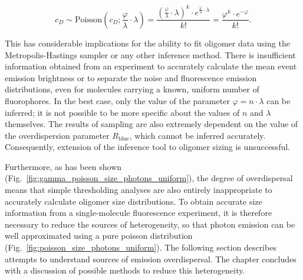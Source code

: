 \begin{equation}
c_D \sim \text{Poisson}(c_D; \frac{\varphi}{\lambda} \cdot \lambda) = \frac{(\frac{\varphi}{\lambda} \cdot \lambda)^k \cdot e^{\frac{\varphi}{\lambda} \cdot \lambda}}{k!} = \frac{\varphi^{k} \cdot e^{-\varphi}}{k!}.
\label{eq:n_photons_2}
\end{equation}  

This has considerable implications for the ability to fit oligomer data using the Metropolis-Hastings sampler or any other inference method. There is insufficient information obtained from an experiment to accurately calculate the mean event emission brightness or to separate the noise and fluorescence emission distributions, even for molecules carrying a known, uniform number of fluorophores. In the best case, only the value of the parameter $\varphi = n \cdot \lambda$ can be inferred; it is not possible to be more specific about the values of $n$ and $\lambda$ themselves. The results of sampling are also extremely dependent on the value of the overdispersion parameter $R_{\text{blue}}$, which cannot be inferred accurately. Consequently, extension of the inference tool to oligomer sizing is unsuccessful. 

Furthermore, as has been shown (Fig.~\ref{fig:gamma_poisson_size_photons_uniform}), the degree of overdispersal means that simple thresholding analyses are also entirely inappropriate to accurately calculate oligomer size distributions. To obtain accurate size information from a single-molecule fluorescence experiment, it is therefore necessary to reduce the sources of heterogeneity, so that photon emission can be well approximated using a pure poisson distribution (Fig.~\ref{fig:poisson_size_photons_uniform}). The following section describes attempts to understand sources of emission overdispersal. The chapter concludes with a discussion of possible methods to reduce this heterogeneity.   

